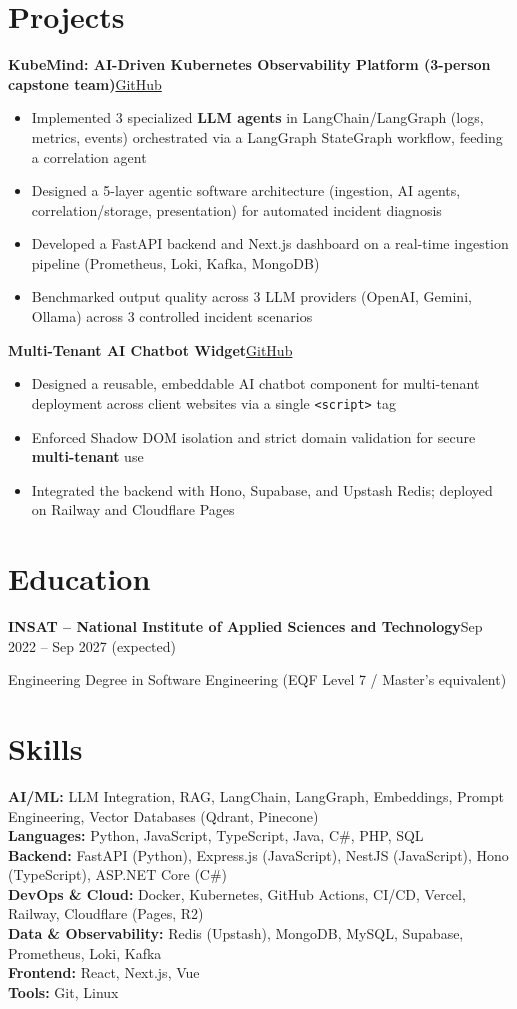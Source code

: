 \documentclass[10pt,a4paper]{article}
\newcommand{\entry}[2]{\vspace{1pt}\noindent\textbf{#1}\hfill{\color{muted}#2}\par}
\newcommand{\gh}[1]{\href{https://github.com/Hsan003/#1}{GitHub}}
\begin{document}
\section{Projects}
\entry{KubeMind: AI-Driven Kubernetes Observability Platform (3-person capstone team)}{\gh{kubemind}}
\begin{itemize}
  \item Implemented 3 specialized \textbf{LLM agents} in LangChain/LangGraph (logs, metrics, events) orchestrated via a LangGraph StateGraph workflow, feeding a correlation agent
  \item Designed a 5-layer agentic software architecture (ingestion, AI agents, correlation/storage, presentation) for automated incident diagnosis
  \item Developed a FastAPI backend and Next.js dashboard on a real-time ingestion pipeline (Prometheus, Loki, Kafka, MongoDB)
  \item Benchmarked output quality across 3 LLM providers (OpenAI, Gemini, Ollama) across 3 controlled incident scenarios
\end{itemize}
\entry{Multi-Tenant AI Chatbot Widget}{\gh{AI-Assistant-Backend}}
\begin{itemize}
  \item Designed a reusable, embeddable AI chatbot component for multi-tenant deployment across client websites via a single \texttt{<script>} tag
  \item Enforced Shadow DOM isolation and strict domain validation for secure \textbf{multi-tenant} use
  \item Integrated the backend with Hono, Supabase, and Upstash Redis; deployed on Railway and Cloudflare Pages
\end{itemize}

\section{Education}
\entry{INSAT -- National Institute of Applied Sciences and Technology}{Sep 2022 -- Sep 2027 (expected)}
Engineering Degree in Software Engineering (EQF Level 7 / Master's equivalent)

\section{Skills}
\textbf{AI/ML:} LLM Integration, RAG, LangChain, LangGraph, Embeddings, Prompt Engineering, Vector Databases (Qdrant, Pinecone)\\
\textbf{Languages:} Python, JavaScript, TypeScript, Java, C\#, PHP, SQL\\
\textbf{Backend:} FastAPI (Python), Express.js (JavaScript), NestJS (JavaScript), Hono (TypeScript), ASP.NET Core (C\#)\\
\textbf{DevOps \& Cloud:} Docker, Kubernetes, GitHub Actions, CI/CD, Vercel, Railway, Cloudflare (Pages, R2)\\
\textbf{Data \& Observability:} Redis (Upstash), MongoDB, MySQL, Supabase, Prometheus, Loki, Kafka\\
\textbf{Frontend:} React, Next.js, Vue\\
\textbf{Tools:} Git, Linux
\end{document}
